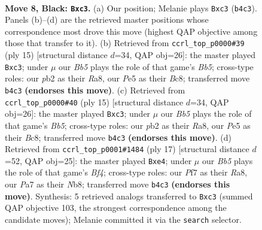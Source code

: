 \documentclass[11pt]{article}
\begin{document}
\begin{figure}[p]\centering
\begin{subfigure}{0.46\textwidth}\centering
\resizebox{\linewidth}{!}{%
\newchessgame
\chessboard[
  setfen={r1bq1rk1/p1p2ppp/2pp1n2/4p3/1b2P2P/2NP1N2/PPP2PP1/R1BQ1RK1 b - - 0 8},
  showmover=false,
  pgfstyle=straightmove, color=movearrow, markmove={b4-c3}
]}
\caption{}
\end{subfigure}\hfill
\begin{subfigure}{0.46\textwidth}\centering
\resizebox{\linewidth}{!}{%
\newchessgame
\chessboard[
  setfen={r1b1k2r/p1p1qppp/2pp1n2/4p3/1b2P3/2NP1N1P/PPP2PP1/R1BQ1RK1 b kq - 2 8},
  showmover=false,
  pgfstyle=straightmove, color=movearrow, markmove={b4-c3}
]}
\caption{}
\end{subfigure}
\\[4pt]
\begin{subfigure}{0.46\textwidth}\centering
\resizebox{\linewidth}{!}{%
\newchessgame
\chessboard[
  setfen={r1b1k2r/p1p1qppp/2pp1n2/4p3/1b2P3/2NP1N1P/PPP2PP1/R1BQ1RK1 b kq - 2 8},
  showmover=false,
  pgfstyle=straightmove, color=movearrow, markmove={b4-c3}
]}
\caption{}
\end{subfigure}\hfill
\begin{subfigure}{0.46\textwidth}\centering
\resizebox{\linewidth}{!}{%
\newchessgame
\chessboard[
  setfen={rn1q1rk1/pp2ppbp/2pp2p1/5b2/2PPN3/5NP1/PP2PPBP/R1BQR1K1 b - - 0 9},
  showmover=false,
  pgfstyle=straightmove, color=movearrow, markmove={f5-e4}
]}
\caption{}
\end{subfigure}
\caption{\textbf{Move 8, Black: \texttt{Bxc3}.} (a) Our position; Melanie plays \texttt{Bxc3} (\texttt{b4c3}). Panels (b)--(d) are the retrieved master positions whose correspondence most drove this move (highest QAP objective among those that transfer to it). (b) Retrieved from \texttt{ccrl\_top\_p0000\#39} (ply 15) [structural distance $d$=34, QAP obj=26]: the master played \texttt{Bxc3}; under $\mu$ our \emph{Bb5} plays the role of that game's \emph{Bb5}; cross-type roles: our \emph{p}b2 as their \emph{R}a8, our \emph{P}e5 as their \emph{B}c8; transferred move \texttt{b4c3} \textbf{(endorses this move)}. (c) Retrieved from \texttt{ccrl\_top\_p0000\#40} (ply 15) [structural distance $d$=34, QAP obj=26]: the master played \texttt{Bxc3}; under $\mu$ our \emph{Bb5} plays the role of that game's \emph{Bb5}; cross-type roles: our \emph{p}b2 as their \emph{R}a8, our \emph{P}e5 as their \emph{B}c8; transferred move \texttt{b4c3} \textbf{(endorses this move)}. (d) Retrieved from \texttt{ccrl\_top\_p0001\#1484} (ply 17) [structural distance $d$=52, QAP obj=25]: the master played \texttt{Bxe4}; under $\mu$ our \emph{Bb5} plays the role of that game's \emph{Bf4}; cross-type roles: our \emph{P}f7 as their \emph{R}a8, our \emph{P}a7 as their \emph{N}b8; transferred move \texttt{b4c3} \textbf{(endorses this move)}. Synthesis: 5 retrieved analogs transferred to \texttt{Bxc3} (summed QAP objective 103, the strongest correspondence among the candidate moves); Melanie committed it via the \texttt{search} selector.}
\label{fig:thought-m15}
\end{figure}
\end{document}

